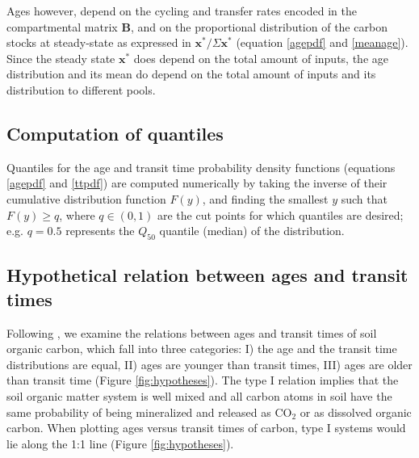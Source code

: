 \documentclass[draft,linenumbers]{agujournal}
\begin{document}
Ages however, depend on the cycling and transfer rates encoded in the compartmental matrix $\mathbf{B}$, and on the proportional distribution of the carbon stocks at steady-state as expressed in $\bm{x}^{\ast} / \Sigma \bm{x}^{\ast}$ (equation \ref{agepdf} and \ref{meanage}). Since the steady state $\bm{x}^{\ast}$ does depend on the total amount of inputs, the age distribution and its mean do depend on the total amount of inputs and its distribution to different pools. 

\subsection{Computation of quantiles}
Quantiles for the age and transit time probability density functions (equations \ref{agepdf} and \ref{ttpdf}) are computed numerically by taking the inverse of their cumulative
distribution function $F(y)$, and finding the smallest $y$ such that $F(y) \geq q$, where $q \in (0, 1)$ are the cut points for which quantiles are desired; e.g. $q =0.5$ represents the $Q_{50}$ quantile (median) of the distribution. 


\subsection{Hypothetical relation between ages and transit times}
Following \citet{Bolin1973}, we examine the relations between ages and transit times of soil organic carbon, which fall into three categories: I) the age and the transit time distributions are equal, II) ages are younger than transit times, III) ages are older than transit time (Figure \ref{fig:hypotheses}). The type I relation implies that the soil organic matter system is well mixed and all carbon atoms in soil have the same probability of being mineralized and released as CO$_2$ or as dissolved organic carbon. When plotting ages versus transit times of carbon, type I systems would lie along the 1:1 line (Figure \ref{fig:hypotheses}).  

\end{document}
